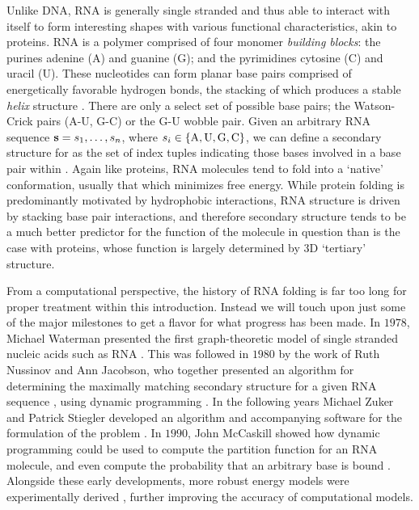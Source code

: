 Unlike DNA, RNA is generally single stranded and thus able to interact with itself
to form interesting shapes with various functional characteristics, akin to
proteins. RNA is a polymer comprised of four monomer {\em building blocks}:
the purines
adenine (A) and guanine (G); and the pyrimidines cytosine (C) and uracil (U). These
nucleotides can form planar base pairs comprised of energetically favorable
hydrogen bonds, the stacking of which produces a stable {\em helix} structure
\citep{yakovchuk:2006bm}. There are only a select set of possible base pairs; the
Watson-Crick pairs (A-U, G-C) or the G-U wobble pair. Given an arbitrary RNA
sequence ${\bf s} = s_1,\dots,s_n$, where $s_i \in \{\text{A,\,U,\,G,\,C}\}$, we can define
a secondary structure \str for \seq as the set of index tuples indicating those
bases involved in a base pair within \seq. Again like proteins, RNA molecules tend
to fold into a `native' conformation, usually that which minimizes free energy.
While protein folding is predominantly motivated by hydrophobic
interactions, RNA structure is driven by stacking base pair interactions, and
therefore secondary structure tends to be a much better predictor for the function
of the molecule in question than is the case with proteins, whose function is
largely determined by 3D `tertiary' structure.

From a computational perspective, the history of RNA folding is far too long for
proper treatment within this introduction. Instead we will touch upon just some
of the major milestones to get a flavor for what progress has been made. In $1978$,
Michael Waterman presented the first graph-theoretic model of single stranded
nucleic acids such as RNA \citep{waterman:1978va}. This was followed in $1980$ by
the work of Ruth Nussinov and Ann Jacobson, who together presented an algorithm for
determining the maximally matching secondary structure \str for
a given RNA sequence \citep{nussinov1980}, using dynamic programming
\citep{bellman:1952vza}. In the following years Michael Zuker and Patrick Stiegler
developed an algorithm and accompanying software for the \mfe
formulation of the problem \citep{zuker:1981tf,zuker:1989im}. In $1990$, John
McCaskill showed how dynamic programming could be used to compute the
partition function for an RNA molecule, and even compute the probability that an
arbitrary base is bound \citep{mccaskill}. Alongside these early developments,
more robust energy models were experimentally derived \citep{turner,turner:2009vy},
further improving the accuracy of computational models.

